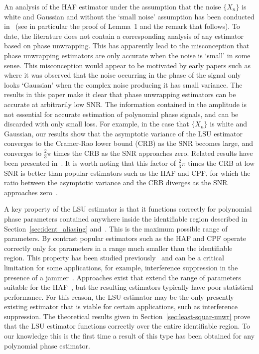 \documentclass[journal]{IEEEtran}
\begin{document}
An analysis of the HAF estimator under the assumption that the noise $\{X_n\}$ is white and Gaussian and without the `small noise' assumption has been conducted in~\cite{Porat_asympt_HAF_DPT_1996} (see in particular the proof of Lemma~1 and the remark that follows).  To date, the literature does not contain a corresponding analysis of any estimator based on phase unwrapping.  This has apparently lead to the misconception that phase unwrapping estimators are only accurate when the noise is `small' in some sense.  This misconception would appear to be motivated by early papers such as~\cite{Tretter1985,Kay1989} where it was observed that the noise occurring in the phase of the signal only looks `Gaussian' when the complex noise producing it has small variance.  The results in this paper make it clear that phase unwrapping estimators can be accurate at arbitrarily low SNR.  The information contained in the amplitude is not essential for accurate estimation of polynomial phase signals, and can be discarded with only small loss.  For example, in the case that $\{X_n\}$ is white and Gaussian, our results show that the asymptotic variance of the LSU estimator converges to the Cramer-Rao lower bound (CRB) as the SNR becomes large, and converges to $\tfrac{2}{3}\pi$ times the CRB as the SNR approaches zero.  Related results have been presented in~\cite{Quinn2009_dasp_phase_only_information_loss}.  It is worth noting that this factor of $\tfrac{2}{3}\pi$ times the CRB at low SNR is better than popular estimators such as the HAF and CPF, for which the ratio between the asymptotic variance and the CRB diverges as the SNR approaches zero~\cite{Porat_asympt_HAF_DPT_1996,Oshea_cpf_2004,Djurovic_haf_cpf_2012}.

A key property of the LSU estimator is that it functions correctly for polynomial phase parameters contained anywhere inside the identifiable region described in Section~\ref{sec:ident_aliasing} and~\cite{Xia_dynamic_range_pps_2001,McKilliam2009IndentifiabliltyAliasingPolyphase}.  This is the maximum possible range of parameters.  By contrast popular estimators such as the HAF and CPF operate correctly only for parameters in a range much smaller than the identifiable region.  This property has been studied previously~\cite{Djurovic_aliasing_2012,McKilliam2009IndentifiabliltyAliasingPolyphase,Zhou_lag_diverity_PPT_1997,Xia_dynamic_range_pps_2001} and can be a critical limitation for some applications, for example, interference suppression in the presence of a jammer~\cite{Djukanovic:2011:PMN:1950994.1951252,Djurovic_aliasing_2012}.  Approaches exist that extend the range of parameters suitable for the HAF~\cite{Zhou_lag_diverity_PPT_1997,Djurovic_aliasing_2012}, but the resulting estimators typically have poor statistical performance.  For this reason, the LSU estimator may be the only presently existing estimator that is viable for certain applications, such as interference suppression.  The theoretical results given in Section~\ref{sec:least-squar-unwr} prove that the LSU estimator functions correctly over the entire identifiable region.  To our knowledge this is the first time a result of this type has been obtained for any polynomial phase estimator.
\end{document}
